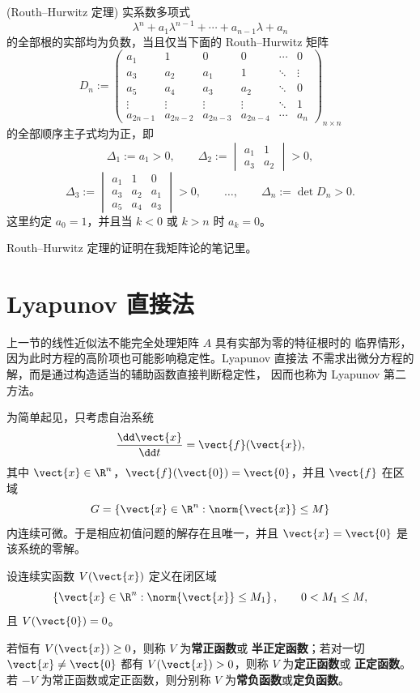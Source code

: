 \begin{theorem}(Routh--Hurwitz 定理)\label{thm:RouthHurwitz定理}
	实系数多项式
	\[
		\lambda^n+a_1\lambda^{n-1}+\cdots
		+a_{n-1}\lambda+a_n
	\]
	的全部根的实部均为负数，当且仅当下面的 Routh--Hurwitz 矩阵
	\[
		D_n\mathrel{:=}
		\begin{pmatrix}
			a_1&1&0&0&\cdots&0\\
			a_3&a_2&a_1&1&\ddots&\vdots\\
			a_5&a_4&a_3&a_2&\ddots&0\\
			\vdots&\vdots&\vdots&\vdots&\ddots&1\\
			a_{2n-1}&a_{2n-2}&a_{2n-3}&a_{2n-4}&\cdots&a_n
		\end{pmatrix}_{n\times n}
	\]
	的全部顺序主子式均为正，即
	\[
		\Delta_1\mathrel{:=}a_1>0,
		\qquad
		\Delta_2\mathrel{:=}
		\begin{vmatrix}
			a_1&1\\
			a_3&a_2
		\end{vmatrix}>0,
	\]
	\[
		\Delta_3\mathrel{:=}
		\begin{vmatrix}
			a_1&1&0\\
			a_3&a_2&a_1\\
			a_5&a_4&a_3
		\end{vmatrix}>0,
		\qquad \ldots,
		\qquad
		\Delta_n\mathrel{:=}\det D_n>0.
	\]
	这里约定 $a_0=1$，并且当 $k<0$ 或 $k>n$ 时 $a_k=0$。
\end{theorem}

Routh--Hurwitz 定理的证明在我矩阵论的笔记里。

\section{Lyapunov 直接法}\label{sec:Lyapunov直接法}

上一节的线性近似法不能完全处理矩阵 $A$ 具有实部为零的特征根时的
临界情形，因为此时方程的高阶项也可能影响稳定性。Lyapunov 直接法
不需求出微分方程的解，而是通过构造适当的辅助函数直接判断稳定性，
因而也称为 Lyapunov 第二方法。

为简单起见，只考虑自治系统
\[
	\dfrac{\dd\vect{x}}{\dd t}=\vect{f}(\vect{x}),
\]
其中 $\vect{x}\in\R^n$，$\vect{f}(\vect{0})=\vect{0}$，并且
$\vect{f}$ 在区域
\[
	G=\left\{
	\vect{x}\in\R^n:\norm{\vect{x}}\leq M
	\right\}
\]
内连续可微。于是相应初值问题的解存在且唯一，并且
$\vect{x}=\vect{0}$ 是该系统的零解。

\begin{definition}\label{def:正定与半正定函数}
	设连续实函数 $V(\vect{x})$ 定义在闭区域
	\[
		\left\{
		\vect{x}\in\R^n:\norm{\vect{x}}\leq M_1
		\right\},
		\qquad 0<M_1\leq M,
	\]
	且 $V(\vect{0})=0$。

	若恒有 $V(\vect{x})\geq0$，则称 $V$ 为\textbf{常正函数}或
	\textbf{半正定函数}；若对一切 $\vect{x}\neq\vect{0}$ 都有
	$V(\vect{x})>0$，则称 $V$ 为\textbf{定正函数}或
	\textbf{正定函数}。若 $-V$ 为常正函数或定正函数，则分别称
	$V$ 为\textbf{常负函数}或\textbf{定负函数}。
\end{definition}

